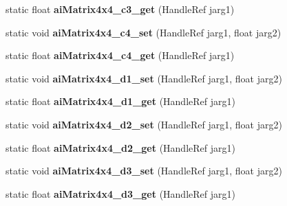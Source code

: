 \begin{DoxyCompactItemize}
\item 
\hypertarget{class_assimp_p_i_n_v_o_k_e_a5fdec558cb1bb85298b60653040ec127}{static float {\bfseries ai\+Matrix4x4\+\_\+c3\+\_\+get} (Handle\+Ref jarg1)}\label{class_assimp_p_i_n_v_o_k_e_a5fdec558cb1bb85298b60653040ec127}

\item 
\hypertarget{class_assimp_p_i_n_v_o_k_e_a4c85723382abeb3ef8ce184a53a122c1}{static void {\bfseries ai\+Matrix4x4\+\_\+c4\+\_\+set} (Handle\+Ref jarg1, float jarg2)}\label{class_assimp_p_i_n_v_o_k_e_a4c85723382abeb3ef8ce184a53a122c1}

\item 
\hypertarget{class_assimp_p_i_n_v_o_k_e_aed83995a899f3e66e6636bd4c0bbdd96}{static float {\bfseries ai\+Matrix4x4\+\_\+c4\+\_\+get} (Handle\+Ref jarg1)}\label{class_assimp_p_i_n_v_o_k_e_aed83995a899f3e66e6636bd4c0bbdd96}

\item 
\hypertarget{class_assimp_p_i_n_v_o_k_e_a1dbb8f729ddb4f0f5f605e2556fa6906}{static void {\bfseries ai\+Matrix4x4\+\_\+d1\+\_\+set} (Handle\+Ref jarg1, float jarg2)}\label{class_assimp_p_i_n_v_o_k_e_a1dbb8f729ddb4f0f5f605e2556fa6906}

\item 
\hypertarget{class_assimp_p_i_n_v_o_k_e_a70b3ba6af3ad5744042d3a6f8a7e75fb}{static float {\bfseries ai\+Matrix4x4\+\_\+d1\+\_\+get} (Handle\+Ref jarg1)}\label{class_assimp_p_i_n_v_o_k_e_a70b3ba6af3ad5744042d3a6f8a7e75fb}

\item 
\hypertarget{class_assimp_p_i_n_v_o_k_e_ad0e6489af8af5ec6dbe79fd0e9b6aed1}{static void {\bfseries ai\+Matrix4x4\+\_\+d2\+\_\+set} (Handle\+Ref jarg1, float jarg2)}\label{class_assimp_p_i_n_v_o_k_e_ad0e6489af8af5ec6dbe79fd0e9b6aed1}

\item 
\hypertarget{class_assimp_p_i_n_v_o_k_e_a510c7334e4470bffc9561827498f38da}{static float {\bfseries ai\+Matrix4x4\+\_\+d2\+\_\+get} (Handle\+Ref jarg1)}\label{class_assimp_p_i_n_v_o_k_e_a510c7334e4470bffc9561827498f38da}

\item 
\hypertarget{class_assimp_p_i_n_v_o_k_e_a3d833e896c24f8cbe67bd806cf7b3c31}{static void {\bfseries ai\+Matrix4x4\+\_\+d3\+\_\+set} (Handle\+Ref jarg1, float jarg2)}\label{class_assimp_p_i_n_v_o_k_e_a3d833e896c24f8cbe67bd806cf7b3c31}

\item 
\hypertarget{class_assimp_p_i_n_v_o_k_e_a6cf6624e1cc005919148bb0f8a5f00d7}{static float {\bfseries ai\+Matrix4x4\+\_\+d3\+\_\+get} (Handle\+Ref jarg1)}\label{class_assimp_p_i_n_v_o_k_e_a6cf6624e1cc005919148bb0f8a5f00d7}


\end{DoxyCompactItemize}
